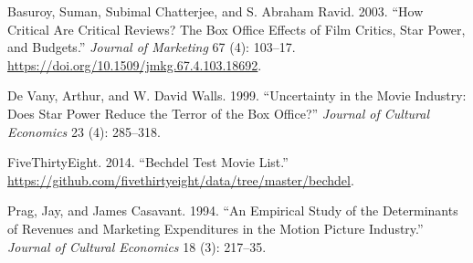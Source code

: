 \documentclass[
  letterpaper,
  DIV=11,
  numbers=noendperiod]{scrartcl}
\newlength{\cslhangindent}
\newenvironment{CSLReferences}[2] %
 {\begin{list}{}{%
  \setlength{\itemindent}{0pt}
  \setlength{\leftmargin}{0pt}
  \setlength{\parsep}{0pt}
  \ifodd #1
   \setlength{\leftmargin}{\cslhangindent}
   \setlength{\itemindent}{-1\cslhangindent}
  \fi
  \setlength{\itemsep}{#2\baselineskip}}}
 {\end{list}}
\begin{document}
\label{refs}
\begin{CSLReferences}{1}{0}
Basuroy, Suman, Subimal Chatterjee, and S. Abraham Ravid. 2003. {``How
Critical Are Critical Reviews? The Box Office Effects of Film Critics,
Star Power, and Budgets.''} \emph{Journal of Marketing} 67 (4): 103--17.
\url{https://doi.org/10.1509/jmkg.67.4.103.18692}.

De Vany, Arthur, and W. David Walls. 1999. {``Uncertainty in the Movie
Industry: Does Star Power Reduce the Terror of the Box Office?''}
\emph{Journal of Cultural Economics} 23 (4): 285--318.

FiveThirtyEight. 2014. {``Bechdel Test Movie List.''}
\url{https://github.com/fivethirtyeight/data/tree/master/bechdel}.

Prag, Jay, and James Casavant. 1994. {``An Empirical Study of the
Determinants of Revenues and Marketing Expenditures in the Motion
Picture Industry.''} \emph{Journal of Cultural Economics} 18 (3):
217--35.

\end{CSLReferences}
\end{document}
